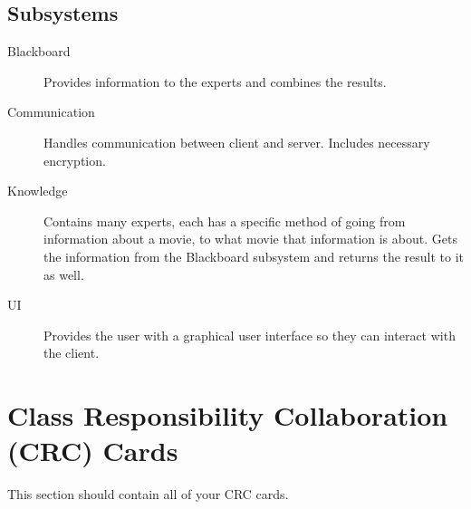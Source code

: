 \documentclass[]{article}
\begin{document}
\subsection{Subsystems}
\label{sub:subsystems}
\begin{description}
	\item[Blackboard] Provides information to the experts and combines the results.
	\item[Communication] Handles communication between client and server. Includes necessary encryption.
	\item[Knowledge] Contains many experts, each has a specific method of going from information about a movie, to what movie that information is about. Gets the information from the Blackboard subsystem and returns the result to it as well.
	\item[UI] Provides the user with a graphical user interface so they can interact with the client.
\end{description}

	
\section{Class Responsibility Collaboration (CRC) Cards}
\label{sec:class_responsibility_collaboration_crc_cards}
This section should contain all of your CRC cards.
\end{document}
